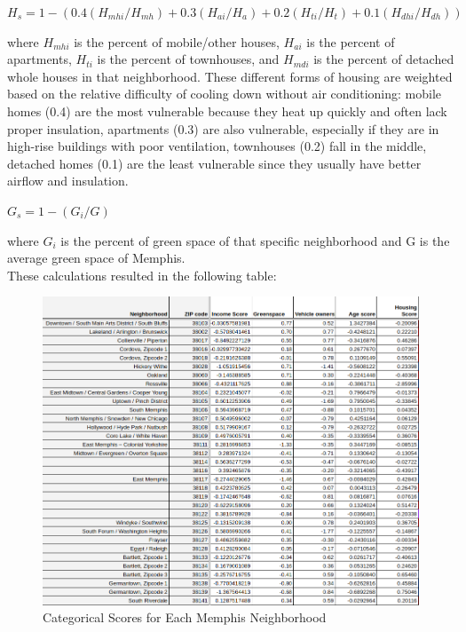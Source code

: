 \documentclass[12pt]{article}
\begin{document}
\begin{center}
$H_s = 1 - (0.4(H_{mhi}/H_{mh})+0.3(H_{ai}/H_{a})+0.2(H_{ti}/H_{t})+0.1(H_{dhi}/H_{dh}))$
\end{center}
where $H_{mhi}$ is the percent of mobile/other houses, $H_{ai}$ is the percent of apartments, $H_{ti}$ is the percent of townhouses, and $H_{mdi}$ is the percent of detached whole houses in that neighborhood. These different forms of housing are weighted based on the relative difficulty of cooling down without air conditioning: mobile homes (0.4) are the most vulnerable because they heat up quickly and often lack proper insulation\cite{https://www.urban.org/urban-wire/mobile-homes-are-vulnerable-climate-extremes-heres-what-policymakers-can-do-next}, apartments (0.3) are also vulnerable, especially if they are in high-rise buildings with poor ventilation, townhouses (0.2) fall in the middle, detached homes (0.1) are the least vulnerable since they usually have better airflow and insulation.

\begin{center}
$G_s = 1 - (G_{i}/G)$
\end{center}
where $G_{i}$ is the percent of green space of that specific neighborhood and G is the average green space of Memphis.\\

These calculations resulted in the following table: 
\begin{figure}[H]
\centering
\includegraphics[scale=0.5]{Q3IndividualScores.png}
\caption{Categorical Scores for Each Memphis Neighborhood}
\end{figure}
\end{document}
